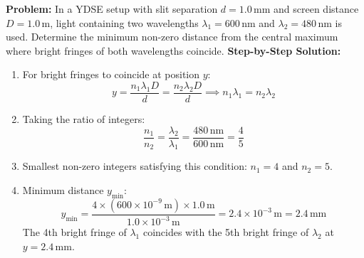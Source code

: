 \documentclass[10pt,twoside,openright]{book}
\begin{document}
\begin{usecasebox}
\textbf{Problem:} In a YDSE setup with slit separation $d = 1.0\,\mathrm{mm}$ and screen distance $D = 1.0\,\mathrm{m}$, light containing two wavelengths $\lambda_1 = 600\,\mathrm{nm}$ and $\lambda_2 = 480\,\mathrm{nm}$ is used. Determine the minimum non-zero distance from the central maximum where bright fringes of both wavelengths coincide.
\textbf{Step-by-Step Solution:}
\begin{enumerate}
  \item For bright fringes to coincide at position $y$:
  \begin{equation}
    y = \frac{n_1 \lambda_1 D}{d} = \frac{n_2 \lambda_2 D}{d} \implies n_1 \lambda_1 = n_2 \lambda_2
  \end{equation}
  \item Taking the ratio of integers:
  \begin{equation}
    \frac{n_1}{n_2} = \frac{\lambda_2}{\lambda_1} = \frac{480\,\mathrm{nm}}{600\,\mathrm{nm}} = \frac{4}{5}
  \end{equation}
  \item Smallest non-zero integers satisfying this condition: $n_1 = 4$ and $n_2 = 5$.
  \item Minimum distance $y_{\min}$:
  \begin{equation}
    y_{\min} = \frac{4 \times (600 \times 10^{-9}\,\mathrm{m}) \times 1.0\,\mathrm{m}}{1.0 \times 10^{-3}\,\mathrm{m}} = 2.4 \times 10^{-3}\,\mathrm{m} = \mathbf{2.4\,\mathrm{mm}}
  \end{equation}
  The 4th bright fringe of $\lambda_1$ coincides with the 5th bright fringe of $\lambda_2$ at $y = 2.4\,\mathrm{mm}$.
\end{enumerate}
\end{usecasebox}
\end{document}
